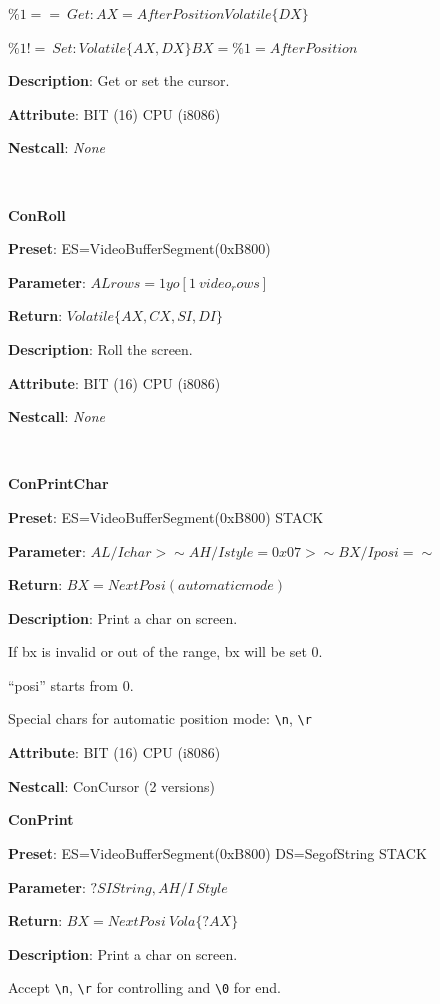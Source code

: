 $\%1==~ Get: AX=AfterPosition Volatile\{DX\}$

$\%1!=~ Set: Volatile\{AX, DX\} BX=\%1=AfterPosition$

\textbf{Description}: Get or set the cursor.

\textbf{Attribute}: BIT (16) CPU (i8086)

\textbf{Nestcall}: \textit{None}



 \

\textbf{ConRoll}

\textbf{Preset}: ES=VideoBufferSegment(0xB800)

\textbf{Parameter}: $AL rows=1 yo \left[1~video_rows\right]$

\textbf{Return}: $Volatile\{AX, CX, SI, DI\}$

\textbf{Description}: Roll the screen.

\textbf{Attribute}: BIT (16) CPU (i8086)

\textbf{Nestcall}: \textit{None}



 \

\textbf{ConPrintChar}

\textbf{Preset}: ES=VideoBufferSegment(0xB800) STACK

\textbf{Parameter}: $AL/I char > \sim AH/I style=0x07 > \sim BX/I posi=\sim$

\textbf{Return}: $BX=NextPosi(automatic mode)$

\textbf{Description}: Print a char on screen.

If bx is invalid or out of the range, bx will be set 0.

``posi'' starts from 0.

Special chars for automatic position mode: \verb|\n|, \verb|\r|

\textbf{Attribute}: BIT (16) CPU (i8086)

\textbf{Nestcall}: ConCursor (2 versions)

\textbf{ConPrint}

\textbf{Preset}: ES=VideoBufferSegment(0xB800) DS=SegofString STACK

\textbf{Parameter}: $?SI String, AH/I\ Style$

\textbf{Return}: $BX=NextPosi\ Vola\{?AX\}$

\textbf{Description}: Print a char on screen.

Accept \verb|\n|, \verb|\r| for controlling and \verb|\0| for end.

